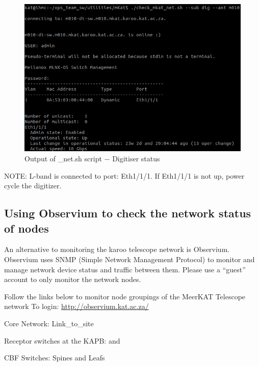 \begin{figure}[H]
	\centering
	\includegraphics[scale=0.43]{Chapters/images/image75.png}
	
	\caption{Output of \_net.sh script $-$ Digitiser status}
	\label{fig:image75}
\end{figure}


NOTE: L-band is connected to port: Eth1/1/1. If Eth1/1/1 is not up, power cycle the digitizer.

\subsection{ Using Observium to check the network status of nodes}
An alternative to monitoring the karoo telescope network is Observium. Observium uses SNMP (Simple Network Management Protocol) to monitor and manage network device status and traffic between them. Please use a “guest” account to only monitor the network nodes. 

Follow  the links below to monitor node groupings of the MeerKAT Telescope network
To login: \url{http://observium.kat.ac.za/}


Core Network: Link\_to\_site 

Receptor switches at the KAPB:  and  

CBF Switches: Spines and Leafs

